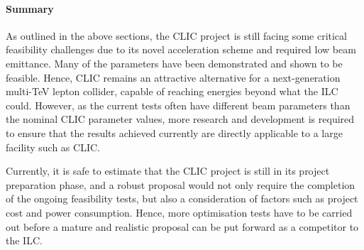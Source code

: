 \begin{table}[!htb]
\caption{Major parameters related to achieving ultra-low emittances of main beam in the Acceleration Test Facility, compared to the nominal parameter values for CLIC at two energy stages (500 GeV and 3 TeV). \cite{CLIC:Concept}}
\label{tab:CLIC:Feasi4}
\end{table}

\paragraph{Summary}

As outlined in the above sections, the CLIC project is still facing some critical feasibility challenges due to its novel acceleration scheme and required low beam emittance. Many of the parameters have been demonstrated and shown to be feasible. Hence, CLIC remains an attractive alternative for a next-generation multi-TeV lepton collider, capable of reaching energies beyond what the ILC could. However, as the current tests often have different beam parameters than the nominal CLIC parameter values, more research and development is required to ensure that the results achieved currently are directly applicable to a large facility such as CLIC.

Currently, it is safe to estimate that the CLIC project is still in its project preparation phase, and a robust proposal would not only require the completion of the ongoing feasibility tests, but also a consideration of factors such as project cost and power consumption. Hence, more optimisation tests have to be carried out before a mature and realistic proposal can be put forward as a competitor to the ILC. \cite{CLIC:Concept}

